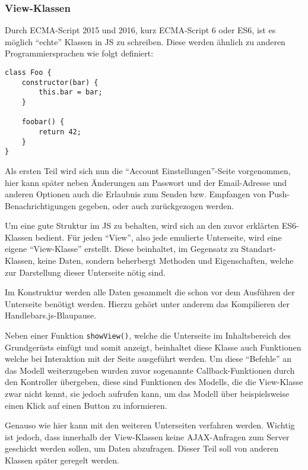 \documentclass[a4paper,12pt,ngerman,listof=numbered]{scrartcl}      %
\providecommand{\inlinecode}[1]{\texttt{#1}}
\begin{document}
	\subsubsection{View-Klassen}
	Durch ECMA-Script 2015 und 2016, kurz ECMA-Script 6 oder ES6, ist es möglich ``echte'' Klassen in JS zu schreiben. Diese werden ähnlich zu anderen Programmiersprachen wie folgt definiert:\par
	\begin{verbatim}
class Foo {
    constructor(bar) {
        this.bar = bar;
    }
    
    foobar() {
        return 42;
    }
}
	\end{verbatim}
	Als ersten Teil wird sich nun die ``Account Einstellungen''-Seite vorgenommen, hier kann später neben Änderungen am Passwort und der Email-Adresse und anderen Optionen auch die Erlaubnis zum Senden bzw. Empfangen von Push-Be\-nach\-rich\-ti\-gungen gegeben, oder auch zurückgezogen werden.\par
	Um eine gute Struktur im JS zu behalten, wird sich an den zuvor erklärten ES6-Klassen bedient. Für jeden ``View'', also jede emulierte Unterseite, wird eine eigene ``View-Klasse'' erstellt. Diese beinhaltet, im Gegensatz zu Standart-Klassen, keine Daten, sondern beherbergt Methoden und Eigenschaften, welche zur Darstellung dieser Unterseite nötig sind.\par
	Im Konstruktur werden alle Daten gesammelt die schon vor dem Ausführen der Unterseite benötigt werden. Hierzu gehört unter anderem das Kompilieren der Handlebars.js-Blaupause.\par
	Neben einer Funktion \inlinecode{showView()}, welche die Unterseite im Inhaltsbereich des Grundgerüsts einfügt und somit anzeigt, beinhaltet diese Klasse auch Funktionen welche bei Interaktion mit der Seite ausgeführt werden. Um diese ``Befehle'' an das Modell weiterzugeben wurden zuvor sogenannte Callback-Funktionen durch den Kontroller übergeben, diese sind Funktionen des Modells, die die View-Klasse zwar nicht kennt, sie jedoch aufrufen kann, um das Modell über beispielsweise einen Klick auf einen Button zu informieren.\par
	Genauso wie hier kann mit den weiteren Unterseiten verfahren werden. Wichtig ist jedoch, dass innerhalb der View-Klassen keine AJAX-Anfragen zum Server geschickt werden sollen, um Daten abzufragen. Dieser Teil soll von anderen Klassen später geregelt werden.\par
	
\end{document}
